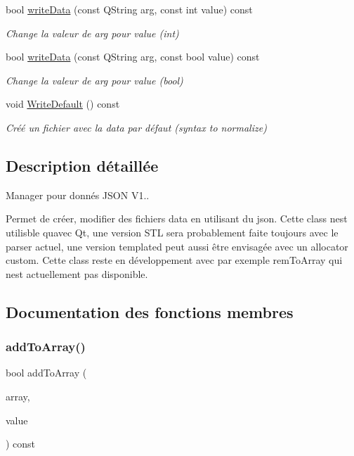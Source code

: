 \begin{DoxyCompactItemize}
bool \hyperlink{classDataManager_a96ac6856ddebd921ac034c3103f1d755}{write\+Data} (const Q\+String arg, const int value) const
\begin{DoxyCompactList}\small\item\em Change la valeur de arg pour value (int) \end{DoxyCompactList}\item 
bool \hyperlink{classDataManager_ab2cc4cd3515c1947b59a275f8851c2a5}{write\+Data} (const Q\+String arg, const bool value) const
\begin{DoxyCompactList}\small\item\em Change la valeur de arg pour value (bool) \end{DoxyCompactList}\item 
\mbox{\label{classDataManager_ac872ade481f99cf93bbf9ed4d9dfac3f}} 
void \hyperlink{classDataManager_ac872ade481f99cf93bbf9ed4d9dfac3f}{Write\+Default} () const
\begin{DoxyCompactList}\small\item\em Créé un fichier avec la data par défaut (syntax to normalize) \end{DoxyCompactList}\end{DoxyCompactItemize}


\subsection{Description détaillée}
Manager pour donnés J\+S\+ON V1.. 

Permet de créer, modifier des fichiers data en utilisant du json. Cette class n\textquotesingle{}est utilisble qu\textquotesingle{}avec Qt, une version S\+TL sera probablement faite toujours avec le parser actuel, une version templated peut aussi être envisagée avec un allocator custom. Cette class reste en développement avec par exemple rem\+To\+Array qui n\textquotesingle{}est actuellement pas disponible. 

\subsection{Documentation des fonctions membres}
\mbox{\label{classDataManager_a45a34311e5a2d6d192293eaeaff22a6e}} 
\subsubsection{\texorpdfstring{add\+To\+Array()}{addToArray()}\hspace{0.1cm}{\footnotesize\ttfamily [1/2]}}
{\footnotesize\ttfamily bool add\+To\+Array (\begin{DoxyParamCaption}\item[{const Q\+String}]{array,  }\item[{const Q\+String}]{value }\end{DoxyParamCaption}) const\hspace{0.3cm}{\ttfamily [inline]}}



